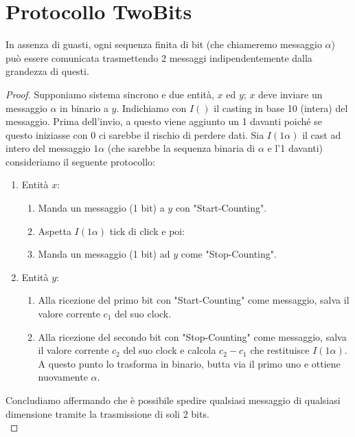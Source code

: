\section{Protocollo TwoBits}

\begin{theorem}
    In assenza di guasti, ogni sequenza finita di bit (che chiameremo
    messaggio $\alpha$) può essere comunicata trasmettendo 2 messaggi
    indipendentemente dalla grandezza di questi.
\end{theorem}

\begin{proof}
    Supponiamo sistema sincrono e due entità, $x$ ed $y$; $x$ deve inviare un
    messaggio $\alpha$ in binario a $y$. Indichiamo con $I()$ il casting in base
    10 (intera) del messaggio. Prima dell'invio, a questo viene aggiunto un 1
    davanti poiché se questo iniziasse con 0 ci sarebbe il rischio di perdere
    dati. Sia $I(1\alpha)$ il cast ad intero del messaggio $1\alpha$ (che
    sarebbe la sequenza binaria di $\alpha$ e l'1 davanti) consideriamo il
    seguente protocollo:
    \begin{enumerate}
        \item Entità $x$:
              \begin{enumerate}
                  \item Manda un messaggio (1 bit) a $y$ con "Start-Counting".
                  \item Aspetta $I(1\alpha)$ tick di click e poi:
                  \item Manda un messaggio (1 bit) ad $y$ come "Stop-Counting".
              \end{enumerate}
        \item Entità $y$:
              \begin{enumerate}
                  \item Alla ricezione del primo bit con "Start-Counting" come messaggio,
                        salva il valore corrente $c_1$ del suo clock.
                  \item Alla ricezione del secondo bit con "Stop-Counting" come
                        messaggio, salva il valore corrente $c_2$ del suo clock
                        e calcola $c_2 - c_1$ che restituisce $I(1\alpha)$. A
                        questo punto lo trasforma in binario, butta via il primo
                        uno e ottiene nuovamente $\alpha$.
              \end{enumerate}
    \end{enumerate}
    Concludiamo affermando che è possibile spedire qualsiasi messaggio di qualsiasi
    dimensione tramite la trasmissione di soli 2 bits.\\
\end{proof}

